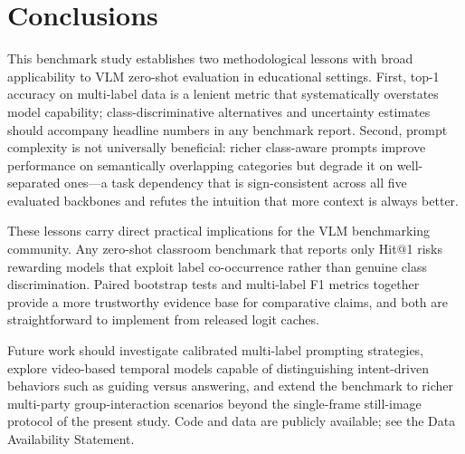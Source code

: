 \documentclass[symmetry,article,submit,pdftex,moreauthors]{Definitions/mdpi}
\begin{document}
\section{Conclusions}
\label{sec:conclusion}

This benchmark study establishes two methodological lessons with broad applicability to VLM zero-shot evaluation in educational settings. First, top-1 accuracy on multi-label data is a lenient metric that systematically overstates model capability; class-discriminative alternatives and uncertainty estimates should accompany headline numbers in any benchmark report. Second, prompt complexity is not universally beneficial: richer class-aware prompts improve performance on semantically overlapping categories but degrade it on well-separated ones---a task dependency that is sign-consistent across all five evaluated backbones and refutes the intuition that more context is always better.

These lessons carry direct practical implications for the VLM benchmarking community. Any zero-shot classroom benchmark that reports only Hit@1 risks rewarding models that exploit label co-occurrence rather than genuine class discrimination. Paired bootstrap tests and multi-label F1 metrics together provide a more trustworthy evidence base for comparative claims, and both are straightforward to implement from released logit caches.

Future work should investigate calibrated multi-label prompting strategies, explore video-based temporal models capable of distinguishing intent-driven behaviors such as guiding versus answering, and extend the benchmark to richer multi-party group-interaction scenarios beyond the single-frame still-image protocol of the present study. Code and data are publicly available; see the Data Availability Statement.


\vspace{6pt}

\end{document}

